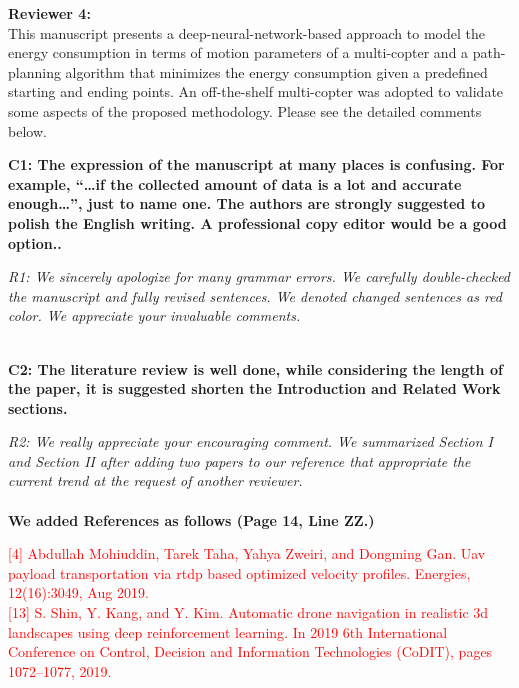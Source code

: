 \documentclass[onecolumn]{IEEEconf}
\begin{document}
\textbf{\large Reviewer 4:}\\
This manuscript presents a deep-neural-network-based approach to model the energy consumption in terms of motion parameters of a multi-copter and a path-planning algorithm that minimizes the energy consumption given a predefined starting and ending points. An off-the-shelf multi-copter was adopted to validate some aspects of the proposed methodology.  Please see the detailed comments below. 
\begin{description}
    \item \textbf
	{
	C1: The expression of the manuscript at many places is confusing. For example, “…if the collected amount of data is a lot and accurate enough…”, just to name one. The authors are strongly suggested to polish the English writing.  A professional copy editor would be a good option..
	}
	\item \textit
	{
	R1: We sincerely apologize for many grammar errors. We carefully double-checked the manuscript and fully revised sentences. We denoted changed sentences as red color. We appreciate your invaluable comments.  
	}
	~\\
    ~\\
    \item \textbf
    {
	C2: The literature review is well done, while considering the length of the paper, it is suggested shorten the Introduction and Related Work sections.
	}
	\item \textit
	{
	R2: We really appreciate your encouraging comment. We summarized Section I and Section II after adding two papers to our reference that appropriate the current trend at the request of another reviewer.
	}
	~\\
    ~\\
	\textbf{We added References as follows (Page 14, Line ZZ.)}
    \begin{mdframed} [ linewidth=.75pt, userdefinedwidth=0.9\textwidth]
    \textcolor{red}{[4] Abdullah Mohiuddin, Tarek Taha, Yahya Zweiri, and Dongming Gan. Uav payload transportation via rtdp  based optimized velocity profiles. Energies, 12(16):3049, Aug 2019.} \\
    \textcolor{red}{[13] S. Shin, Y. Kang, and Y. Kim. Automatic drone navigation in realistic 3d landscapes using deep reinforcement learning. In 2019 6th International Conference on Control, Decision and Information Technologies (CoDIT), pages 1072–1077, 2019.}
    \end{mdframed} 
    ~\\
    ~\\

\end{description}
\end{document}
